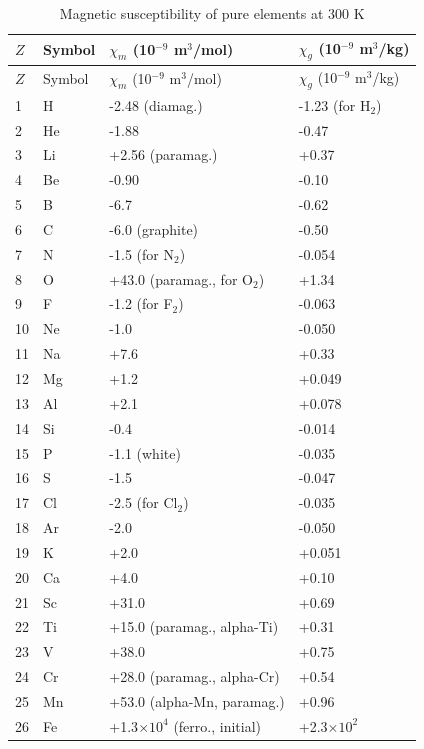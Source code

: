 \documentclass[12pt,a4paper]{article}
\begin{document}
	\begin{longtable}{p{0.6cm}p{1.2cm}p{2.5cm}p{2.5cm}}
		\caption{Magnetic susceptibility of pure elements at 300 K} \label{tab:magnetic-susceptibility-all} \\
		\toprule
		\(Z\) & Symbol & \(\chi_m\) (10\(^{-9}\) m\(^3\)/mol) & \(\chi_g\) (10\(^{-9}\) m\(^3\)/kg) \\
		\midrule
		\endfirsthead
		\toprule
		\(Z\) & Symbol & \(\chi_m\) (10\(^{-9}\) m\(^3\)/mol) & \(\chi_g\) (10\(^{-9}\) m\(^3\)/kg) \\
		\midrule
		\endhead
		1  & H  & -2.48 (diamag.) & -1.23 (for H\(_2\)) \\
		2  & He & -1.88 & -0.47 \\
		3  & Li & +2.56 (paramag.) & +0.37 \\
		4  & Be & -0.90 & -0.10 \\
		5  & B  & -6.7 & -0.62 \\
		6  & C  & -6.0 (graphite) & -0.50 \\
		7  & N  & -1.5 (for N\(_2\)) & -0.054 \\
		8  & O  & +43.0 (paramag., for O\(_2\)) & +1.34 \\
		9  & F  & -1.2 (for F\(_2\)) & -0.063 \\
		10 & Ne & -1.0 & -0.050 \\
		11 & Na & +7.6 & +0.33 \\
		12 & Mg & +1.2 & +0.049 \\
		13 & Al & +2.1 & +0.078 \\
		14 & Si & -0.4 & -0.014 \\
		15 & P  & -1.1 (white) & -0.035 \\
		16 & S  & -1.5 & -0.047 \\
		17 & Cl & -2.5 (for Cl\(_2\)) & -0.035 \\
		18 & Ar & -2.0 & -0.050 \\
		19 & K  & +2.0 & +0.051 \\
		20 & Ca & +4.0 & +0.10 \\
		21 & Sc & +31.0 & +0.69 \\
		22 & Ti & +15.0 (paramag., alpha-Ti) & +0.31 \\
		23 & V  & +38.0 & +0.75 \\
		24 & Cr & +28.0 (paramag., alpha-Cr) & +0.54 \\
		25 & Mn & +53.0 (alpha-Mn, paramag.) & +0.96 \\
		26 & Fe & +1.3\(\times10^4\) (ferro., initial) & +2.3\(\times10^2\) \\

\end{longtable}
\end{document}
